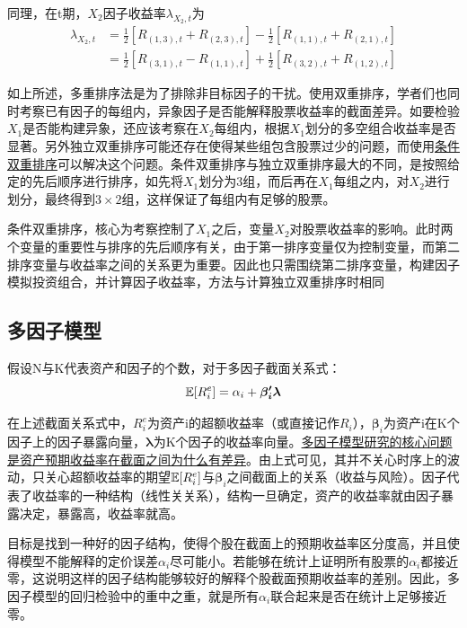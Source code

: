 \documentclass[11pt]{article}
\begin{document}
同理，在t期，$X_2$因子收益率$\lambda_{X_2,t}$为
\begin{align*}
    \lambda_{X_2,t} &= \frac{1}{2} \left[ R_{(1,3),t} + R_{(2,3),t} \right] - \frac{1}{2} \left[R_{(1,1),t} + R_{(2,1),t} \right] \\
    &= \frac{1}{2} \left[ R_{(3,1),t} - R_{(1,1),t} \right] + \frac{1}{2} \left[R_{(3,2),t} + R_{(1,2),t} \right]
\end{align*}

如上所述，多重排序法是为了排除非目标因子的干扰。使用双重排序，学者们也同时考察已有因子的每组内，异象因子是否能解释股票收益率的截面差异。如要检验$X_1$是否能构建异象，还应该考察在$X_2$每组内，根据$X_1$划分的多空组合收益率是否显著。另外独立双重排序可能还存在使得某些组包含股票过少的问题，而使用\uline{条件双重排序}可以解决这个问题。条件双重排序与独立双重排序最大的不同，是按照给定的先后顺序进行排序，如先将$X_1$划分为3组，而后再在$X_1$每组之内，对$X_2$进行划分，最终得到$3\times 2$组，这样保证了每组内有足够的股票。

条件双重排序，核心为考察控制了$X_1$之后，变量$X_2$对股票收益率的影响。此时两个变量的重要性与排序的先后顺序有关，由于第一排序变量仅为控制变量，而第二排序变量与收益率之间的关系更为重要。因此也只需围绕第二排序变量，构建因子模拟投资组合，并计算因子收益率，方法与计算独立双重排序时相同

\subsection{多因子模型}

假设N与K代表资产和因子的个数，对于多因子截面关系式：
\begin{equation*}
    \mathbb{E}[R_{i}^{e}] = \alpha_i + \bm{\beta_{i}' \lambda}
\end{equation*}

在上述截面关系式中，$R_{i}^{e}$为资产i的超额收益率（或直接记作$R_{i}$），$\bm{\beta}_i$为资产i在K个因子上的因子暴露向量，$\bm{\lambda}$为K个因子的收益率向量。\uline{多因子模型研究的核心问题是资产预期收益率在截面之间为什么有差异}。由上式可见，其并不关心时序上的波动，只关心超额收益率的期望$\mathbb{E}[R_{i}^{e}]$与$\bm{\beta}_i$之间截面上的关系（收益与风险）。因子代表了收益率的一种结构（线性关关系），结构一旦确定，资产的收益率就由因子暴露决定，暴露高，收益率就高。

目标是找到一种好的因子结构，使得个股在截面上的预期收益率区分度高，并且使得模型不能解释的定价误差$\alpha_i$尽可能小。若能够在统计上证明所有股票的$\alpha_i$都接近零，这说明这样的因子结构能够较好的解释个股截面预期收益率的差别。因此，多因子模型的回归检验中的重中之重，就是所有$\alpha_i$联合起来是否在统计上足够接近零。
\end{document}

